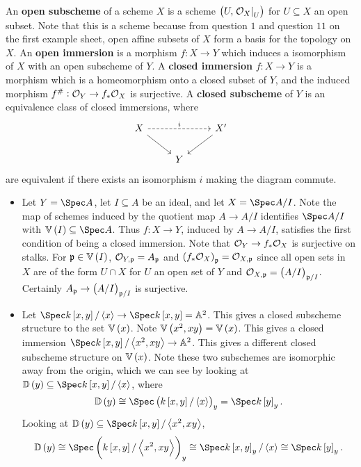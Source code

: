 \begin{definition*}
An \textbf{open subscheme} of a scheme $ X $ is a scheme $ \br{U, \eval{\OOO_X}_U} $ for $ U \subseteq X $ an open subset. Note that this is a scheme because from question $ 1 $ and question $ 11 $ on the first example sheet, open affine subsets of $ X $ form a basis for the topology on $ X $. An \textbf{open immersion} is a morphism $ f : X \to Y $ which induces a isomorphism of $ X $ with an open subscheme of $ Y $. A \textbf{closed immersion} $ f : X \to Y $ is a morphism which is a homeomorphism onto a closed subset of $ Y $, and the induced morphism $ f^\# : \mathcal{O}_Y \to f_*\mathcal{O}_X $ is surjective. A \textbf{closed subscheme} of $ Y $ is an equivalence class of closed immersions, where
$$
\begin{tikzcd}
X \arrow[dashed]{rr}{i} \arrow{dr} & & X' \arrow{dl} \\
& Y &
\end{tikzcd}
$$
are equivalent if there exists an isomorphism $ i $ making the diagram commute.
\end{definition*}

\begin{example*}
\hfill
\begin{itemize}
\item Let $ Y = \Spec A $, let $ I \subseteq A $ be an ideal, and let $ X = \Spec A / I $. Note the map of schemes induced by the quotient map $ A \to A / I $ identifies $ \Spec A / I $ with $ \VV\br{I} \subseteq \Spec A $. Thus $ f : X \to Y $, induced by $ A \to A / I $, satisfies the first condition of being a closed immersion. Note that $ \mathcal{O}_Y \to f_*\mathcal{O}_X $ is surjective on stalks. For $ \ppp \in \VV\br{I} $, $ \mathcal{O}_{Y, \mathfrak{p}} = A_{\mathfrak{p}} $ and $ \br{f_*\OOO_X}_\ppp = \OOO_{X, \ppp} $ since all open sets in $ X $ are of the form $ U \cap X $ for $ U $ an open set of $ Y $ and $ \OOO_{X, \ppp} = \br{A / I}_{\ppp / I} $. Certainly $ A_\ppp \to \br{A / I}_{\ppp / I} $ is surjective.
\item Let $ \Spec k\sbr{x, y} / \abr{x} \to \Spec k\sbr{x, y} = \AA^2 $. This gives a closed subscheme structure to the set $ \VV\br{x} $. Note $ \VV\br{x^2, xy} = \VV\br{x} $. This gives a closed immersion $ \Spec k\sbr{x, y} / \abr{x^2, xy} \to \AA^2 $. This gives a different closed subscheme structure on $ \VV\br{x} $. Note these two subschemes are isomorphic away from the origin, which we can see by looking at $ \DD\br{y} \subseteq \Spec k\sbr{x, y} / \abr{x} $, where
$$ \DD\br{y} \cong \Spec \br{k\sbr{x, y} / \abr{x}}_y = \Spec k\sbr{y}_y. $$
Looking at $ \DD\br{y} \subseteq \Spec k\sbr{x, y} / \abr{x^2, xy} $,
$$ \DD\br{y} \cong \Spec \br{k\sbr{x, y} / \abr{x^2, xy}}_y \cong \Spec k\sbr{x, y}_y / \abr{x} \cong \Spec k\sbr{y}_y. $$
\end{itemize}
\end{example*}

